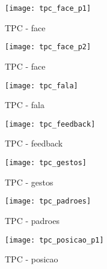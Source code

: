 \begin{figure}[ht!]
    \centering
    \begin{minipage}{\textwidth}
        \caption{TPC - face}
        \texttt{[image: tpc\_face\_p1]}
    \end{minipage}
\end{figure}

\begin{figure}[ht!]
    \centering
    \begin{minipage}{\textwidth}
        \caption{TPC - face}
        \texttt{[image: tpc\_face\_p2]}
    \end{minipage}
\end{figure}

\begin{figure}[ht!]
    \centering
    \begin{minipage}{\textwidth}
        \caption{TPC - fala}
        \texttt{[image: tpc\_fala]}
    \end{minipage}
\end{figure}

\begin{figure}[ht!]
    \centering
    \begin{minipage}{\textwidth}
        \caption{TPC - feedback}
        \texttt{[image: tpc\_feedback]}
    \end{minipage}
\end{figure}

\begin{figure}[ht!]
    \centering
    \begin{minipage}{\textwidth}
        \caption{TPC - gestos}
        \texttt{[image: tpc\_gestos]}
    \end{minipage}
\end{figure}

\begin{figure}[ht!]
    \centering
    \begin{minipage}{\textwidth}
        \caption{TPC - padroes}
        \texttt{[image: tpc\_padroes]}
    \end{minipage}
\end{figure}

\begin{figure}[ht!]
    \centering
    \begin{minipage}{\textwidth}
        \caption{TPC - posicao}
        \texttt{[image: tpc\_posicao\_p1]}
    \end{minipage}
\end{figure}

